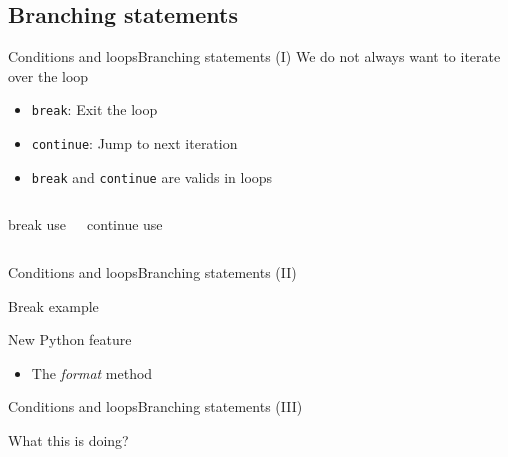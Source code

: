 \documentclass[10pt,compress]{beamer} %
\begin{document}
\subsection{Branching statements}
\begin{frame}{Conditions and loops}{Branching statements (I)}
	We do not always want  to iterate over the loop
	\begin{itemize}
	\item \texttt{break}: Exit the loop
	\item \texttt{continue}: Jump to next iteration
	\item \texttt{break} and \texttt{continue} are valids in loops
	\end{itemize}
	\vspace{-0.2cm}
    \begin{columns}
	\footnotesize{
		\begin{block}{break use}
		\vspace{-0.2cm}
		
		\vspace{-0.2cm}
		\end{block}
	}
	\footnotesize{
		\begin{block}{continue use}
		\vspace{-0.2cm}
		
		\vspace{-0.2cm}
		\end{block}
	}
	\end{columns}
\end{frame}

\begin{frame}{Conditions and loops}{Branching statements (II)}
	\begin{exampleblock}{Break example}
	\vspace{-0.2cm}
	
	\vspace{-0.2cm}
	\end{exampleblock}

    New Python feature
	\begin{itemize}
		\item The \textit{format} method
	\end{itemize}

\end{frame}

\begin{frame}{Conditions and loops}{Branching statements (III)}
	\begin{exampleblock}{What this is doing?}
	\vspace{-0.2cm}
	
	\vspace{-0.2cm}
	\end{exampleblock}
\end{frame}
\end{document}
